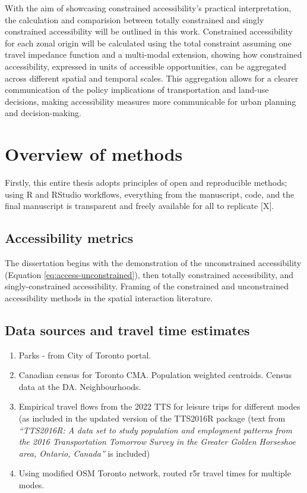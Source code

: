 \documentclass[
11pt, %
oneside, %
english, %
singlespacing, %
]{macthesis} %
\begin{document}
With the aim of showcasing constrained accessibility's practical interpretation, the calculation and comparision between totally constrained and singly constrained accessibility will be outlined in this work. Constrained accessibility for each zonal origin will be calculated using the total constraint assuming one travel impedance function and a multi-modal extension, showing how constrained accessibility, expressed in units of accessible opportunities, can be aggregated across different spatial and temporal scales. This aggregation allows for a clearer communication of the policy implications of transportation and land-use decisions, making accessibility measures more communicable for urban planning and decision-making.

\section{Overview of methods}\label{overview-of-methods}

Firstly, this entire thesis adopts principles of open and reproducible methods; using R and RStudio workflows, everything from the manuscript, code, and the final manuscript is transparent and freely available for all to replicate {[}X{]}.

\subsection{Accessibility metrics}\label{accessibility-metrics}

The dissertation begins with the demonstration of the unconstrained accessibility (Equation \ref{eq:access-unconstrained}), then totally constrained accessibility, and singly-constrained accessibility. Framing of the constrained and unconstrained accessibility methods in the spatial interaction literature.

\subsection{Data sources and travel time estimates}\label{data-sources-and-travel-time-estimates}

\begin{enumerate}
\def\labelenumi{\arabic{enumi})}
\item
  Parks - from City of Toronto portal.
\item
  Canadian census for Toronto CMA. Population weighted centroids. Census data at the DA. Neighbourhoods.
\item
  Empirical travel flows from the 2022 TTS for leisure trips for different modes (as included in the updated version of the TTS2016R package (text from \emph{``TTS2016R: A data set to study population and employment patterns from the 2016 Transportation Tomorrow Survey in the Greater Golden Horseshoe area, Ontario, Canada''} is included)
\item
  Using modified OSM Toronto network, routed r5r travel times for multiple modes.
\end{enumerate}
\end{document}

